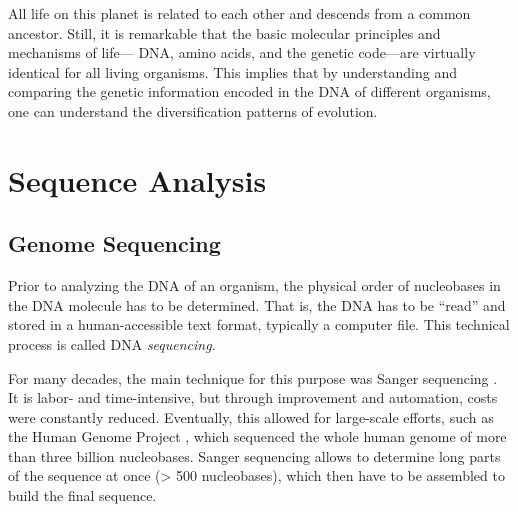 All life on this planet is related to each other and descends from a common ancestor.
Still, it is remarkable that the basic molecular principles and mechanisms of life---%
DNA, amino acids, and the genetic code---are virtually identical for all living organisms.
This implies that by understanding and comparing the genetic information encoded in the DNA of different organisms,
one can understand the diversification patterns of evolution.


\section{Sequence Analysis}
\label{ch:Foundations:sec:SequenceAnalysis}



\subsection{Genome Sequencing}
\label{ch:Foundations:sec:SequenceAnalysis:sub:GenomeSequencing}

Prior to analyzing the DNA of an organism, the physical order of nucleobases in the DNA molecule has to be determined.
That is, the DNA has to be ``read'' and stored in a human-accessible text format, typically a computer file.
This technical process is called DNA \emph{sequencing}.

For many decades, the main technique for this purpose was Sanger sequencing \cite{Sanger1975,Sanger1977}.
It is labor- and time-intensive, but through improvement and automation, costs were constantly reduced.
Eventually, this allowed for large-scale efforts, such as the Human Genome Project \cite{Venter2001},
which sequenced the whole human genome of more than three billion nucleobases.
Sanger sequencing allows to determine long parts of the sequence at once (> \num{500} nucleobases),
which then have to be assembled to build the final sequence.

